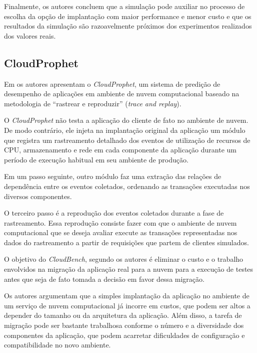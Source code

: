 Finalmente, os autores concluem que a simulação pode auxiliar no processo de escolha da opção de implantação com maior performance e menor custo e que os resultados da simulação são razoavelmente próximos dos experimentos realizados dos valores reais.

\subsection{CloudProphet}\label{subsec:CloudProphet}
Em \cite{li2011cloudprophet} os autores apresentam o \textit{CloudProphet}, um sistema de
predição de desempenho de aplicações em ambiente de nuvem computacional baseado 
na metodologia de ``rastrear e reproduzir'' (\textit{trace and replay}).

O \textit{CloudProphet} não testa a aplicação do cliente de fato no ambiente de nuvem. De
modo contrário, ele injeta na implantação original da aplicação um módulo que 
registra um rastreamento detalhado dos eventos de utilização de recursos de CPU,
armazenamento e rede em cada componente da aplicação durante um período de 
execução habitual em seu ambiente de produção.

Em um passo seguinte, outro módulo faz uma extração das relações de dependência 
entre os eventos coletados, ordenando as transações executadas nos diversos 
componentes.

O terceiro passo é a reprodução dos eventos coletados durante a fase de 
rastreamento. Essa reprodução consiste fazer com que o ambiente de nuvem 
computacional que se deseja avaliar execute as transações representadas nos dados
do rastreamento a partir de requisições que partem de clientes simulados.
   
O objetivo do \textit{CloudBench}, segundo os autores é eliminar o custo e o trabalho 
envolvidos na migração da aplicação real para a nuvem para a execução de testes 
antes que seja de fato tomada a decisão em favor dessa migração.

Os autores argumentam que a simples implantação da aplicação no ambiente de um
serviço de nuvem computacional já incorre em custos, que podem ser altos a 
depender do tamanho ou da arquitetura da aplicação. Além disso, a tarefa de
migração pode ser bastante trabalhosa conforme o número e a diversidade dos 
componentes da aplicação, que podem acarretar dificuldades de configuração e
compatibilidade no novo ambiente.

